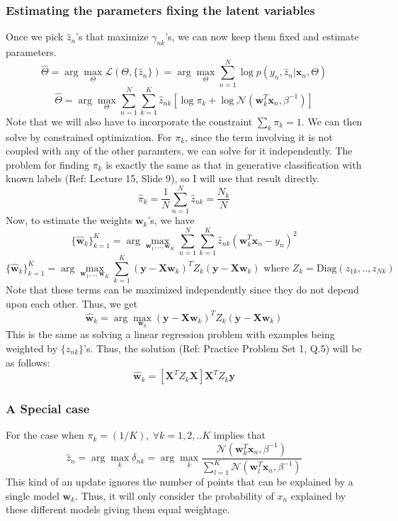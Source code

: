 \documentclass[a4paper,11pt]{article}
\begin{document}
\begin{mlsolution}
\subsubsection{Estimating the parameters fixing the latent variables}
Once we pick $\hat{z}_n$'s that maximize $\gamma_{nk}$'s, we can now keep them fixed and estimate parameters.
\[
\hat{\Theta} = \arg\max_{\Theta}\mathcal{L}(\Theta, \{\hat{z}_n\}) =  \arg\max_{\Theta} \sum_{n=1}^{N}\log p(y_n, \hat{z}_n | \textbf{x}_n, \Theta)
\]
\[
\hat{\Theta} = \arg\max_{\Theta} \sum_{n=1}^{N}\sum_{k=1}^{K}\hat{z}_{nk}\left[ \log\pi_{k} + \log \mathcal{N}(\textbf{w}^{T}_{k}\textbf{x}_n, \beta^{-1}) \right]
\]
Note that we will also have to incorporate the constraint $\sum_{k}\pi_k = 1$. We can then solve by constrained optimization. For $\pi_k$, since the term involving it is not coupled with any of the other paramters, we can solve for it independently. The problem for finding $\pi_k$ is exactly the same as that in generative classification with known labels (Ref: Lecture 15, Slide 9), so I will use that result directly.
\[
\boxed{\hat{\pi}_k = \frac{1}{N}\sum_{n=1}^{N}\hat{z}_{nk} = \frac{N_k}{N}}
\]
Now, to estimate the weights $\textbf{w}_k$'s, we have
\[
\{\hat{\textbf{w}}_k\}_{k=1}^{K} = \arg\max_{\textbf{w}_1,..,\textbf{w}_K}\sum_{n=1}^{N}\sum_{k=1}^{K}\hat{z}_{nk}(\textbf{w}^{T}_{k}\textbf{x}_n - y_n)^{2}
\]
\[
\{\hat{\textbf{w}}_k\}_{k=1}^{K} = \arg\max_{\textbf{w}_1,..,\textbf{w}_K} \sum_{k=1}^{K}(\textbf{y} - \textbf{X}\textbf{w}_k)^{T}Z_{k}(\textbf{y} - \textbf{X}\textbf{w}_k) \text{ where } Z_{k} = \text{Diag}(z_{1k},..,z_{Nk})
\]
Note that these terms can be maximized independently since they do not depend upon each other. Thus, we get
\[
\hat{\textbf{w}}_k = \arg \max_{\textbf{w}_k}(\textbf{y} - \textbf{X}\textbf{w}_k)^{T}Z_{k}(\textbf{y} - \textbf{X}\textbf{w}_k)
\]
This is the same as solving a linear regression problem with examples being weighted by $\{z_{nk}\}$'s. Thus, the solution (Ref: Practice Problem Set 1, Q.5) will be as follows:
\[
\boxed{\hat{\textbf{w}}_k = [\textbf{X}^{T}Z_{k}\textbf{X}]\textbf{X}^{T}Z_{k}\textbf{y}}
\]

\subsubsection{A Special case}
For the case when $\pi_k = (1/K), \ \forall k = 1,2,..K$ implies that 
\[
\hat{z}_n = \arg\max_{k} \delta_{nk} = \arg\max_{k} \frac{ \mathcal{N}(\textbf{w}^{T}_{k}\textbf{x}_n , \beta^{-1})}{\sum_{l=1}^{K} \mathcal{N}(\textbf{w}^{T}_{l}\textbf{x}_n , \beta^{-1})}
\]
This kind of an update ignores the number of points that can be explained by a single model $\textbf{w}_k$. Thus, it will only consider the probability of $x_n$ explained by these different models giving them equal weightage.


\end{mlsolution}
\end{document}
